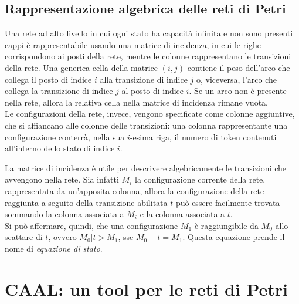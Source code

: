\subsection*{Rappresentazione algebrica delle reti di Petri}
Una rete ad alto livello in cui ogni stato ha capacità infinita
e non sono presenti cappi è rappresentabile usando una matrice di incidenza,
in cui le righe corrispondono ai posti della rete, mentre le colonne
rappresentano le transizioni della rete.
Una generica cella della matrice $(i, j)$ contiene il peso
dell'arco che collega il posto di indice $i$ alla transizione di indice $j$ o,
viceversa, l'arco che collega la transizione di indice $j$ al posto
di indice $i$. Se un arco non è presente nella rete, allora la relativa
cella nella matrice di incidenza rimane vuota.\\
Le configurazioni della rete, invece, vengono specificate
come colonne aggiuntive, che si affiancano alle colonne delle transizioni:
una colonna rappresentante una configurazione conterrà, nella sua $i$-esima
riga, il numero di token contenuti all'interno dello stato di indice $i$.

La matrice di incidenza è utile per descrivere algebricamente
le transizioni che avvengono nella rete.
Sia infatti $M_i$ la configurazione corrente della rete, rappresentata
da un'apposita colonna, allora la configurazione della rete raggiunta
a seguito della transizione abilitata $t$ può essere facilmente trovata
sommando la colonna associata a $M_i$ e la colonna associata a $t$.\\
Si può affermare, quindi, che una configurazione $M_1$ è raggiungibile
da $M_0$ allo scattare di $t$, ovvero $M_0[t>M_1$, sse $M_0 + t = M_1$.
Questa equazione prende il nome di \textit{equazione di stato}.

\section{CAAL: un tool per le reti di Petri}
